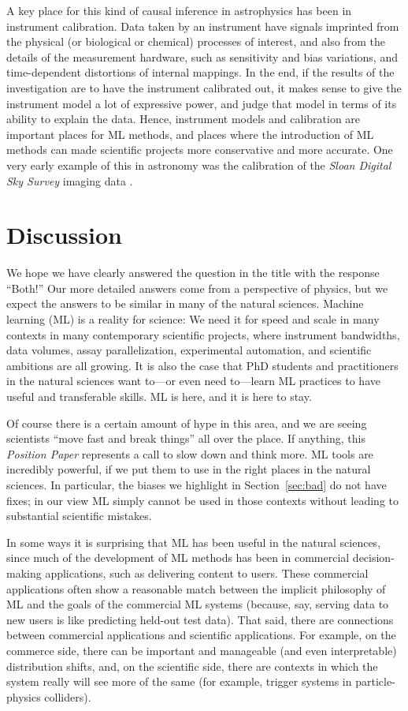 \documentclass{article}
\newcommand{\documentname}{\textsl{Position Paper}}
\newcommand{\sectionname}{Section}
\newcommand{\secref}[1]{\sectionname~\ref{#1}}
\begin{document}
A key place for this kind of causal inference in astrophysics has been in instrument calibration.
Data taken by an instrument have signals imprinted from the physical (or biological or chemical) processes of interest, and also from the details of the measurement hardware, such as sensitivity and bias variations, and time-dependent distortions of internal mappings.
In the end, if the results of the investigation are to have the instrument calibrated out, it makes sense to give the instrument model a lot of expressive power, and judge that model in terms of its ability to explain the data.
Hence, instrument models and calibration are important places for ML methods, and places where the introduction of ML methods can made scientific projects more conservative and more accurate.
One very early example of this in astronomy was the calibration of the \textsl{Sloan Digital Sky Survey} imaging data \cite{ubercalibration}.

\section{Discussion}\label{sec:discussion}

We hope we have clearly answered the question in the title with the response ``Both!''
Our more detailed answers come from a perspective of physics, but we expect the answers to be similar in many of the natural sciences.
Machine learning (ML) is a reality for science:
We need it for speed and scale in many contexts in many contemporary scientific projects, where instrument bandwidths, data volumes, assay parallelization, experimental automation, and scientific ambitions are all growing.
It is also the case that PhD students and practitioners in the natural sciences want to---or even need to---learn ML practices to have useful and transferable skills.
ML is here, and it is here to stay.

Of course there is a certain amount of hype in this area, and we are seeing scientists ``move fast and break things'' all over the place.
If anything, this \documentname{} represents a call to slow down and think more.
ML tools are incredibly powerful, if we put them to use in the right places in the natural sciences.
In particular, the biases we highlight in \secref{sec:bad} do not have fixes; in our view ML simply cannot be used in those contexts without leading to substantial scientific mistakes.

In some ways it is surprising that ML has been useful in the natural sciences, since much of the development of ML methods has been in commercial decision-making applications, such as delivering content to users.
These commercial applications often show a reasonable match between the implicit philosophy of ML and the goals of the commercial ML systems (because, say, serving data to new users is like predicting held-out test data).
That said, there are connections between commercial applications and scientific applications.
For example, on the commerce side, there can be important and manageable (and even interpretable) distribution shifts, and, on the scientific side, there are contexts in which the system really will see more of the same (for example, trigger systems in particle-physics colliders).
\end{document}
